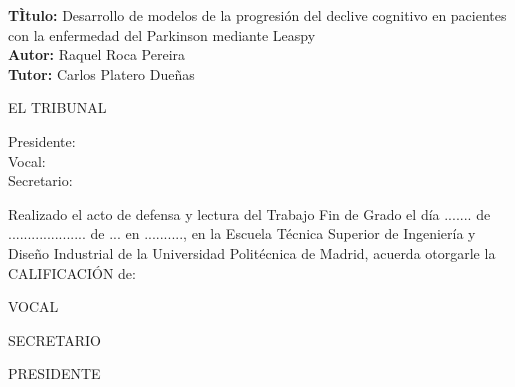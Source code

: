 \cleardoublepage

\begin{flushleft} \large
\textbf{TÌtulo:} {Desarrollo de modelos de la progresión del declive cognitivo en pacientes con la enfermedad del Parkinson mediante Leaspy} \\
\textbf{Autor:} Raquel Roca Pereira\\
\textbf{Tutor:} Carlos Platero Dueñas \\[1 cm]

\end{flushleft} 

\begin{center} \LARGE
EL TRIBUNAL \\ [1 cm]
\end{center}

\begin{flushleft} \LARGE
Presidente: \\ [1 cm]
Vocal: \\ [1 cm]
Secretario: \\ [1.5 cm]
\end{flushleft}

\large
Realizado el acto de defensa y lectura del Trabajo Fin de Grado el día ....... de ....................   de ... en .........., en la Escuela Técnica Superior de Ingeniería y Diseño Industrial de la Universidad Politécnica de Madrid, acuerda otorgarle la CALIFICACIÓN de: \\ [2 cm]

\begin{center}
 \large VOCAL \\ [2.2 cm]
\end{center}

\begin{minipage}{0.5\textwidth}
 \begin{flushleft}
 \large SECRETARIO
\end{flushleft}
\end{minipage}
\begin{minipage}{0.5\textwidth}
\begin{flushright}
 \large PRESIDENTE
\end{flushright} 
\end{minipage}